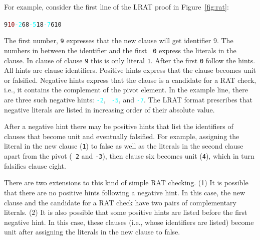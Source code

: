 \documentclass{article}
\begin{document}
For example, consider the first line of the LRAT proof in Figure~\ref{fig:rat}:
\begin{alltt}
\begin{center}
9 \textcolor{darkred}{1 0} \textcolor{cyan}{-2} \textcolor{darkyellow}{6 8} \textcolor{cyan}{-5} \textcolor{darkyellow}{1 8} \textcolor{cyan}{-7} \textcolor{darkyellow}{6 1} 0
\end{center}
\end{alltt}
The first number, {\tt 9} expresses that the new clause will get
identifier 9. The numbers in between the identifier and the first {\tt
  0} express the literals in the clause. In clause of clause {\tt 9}
this is only literal {\tt 1}. After the first {\tt 0} follow the
hints. All hints are clause identifiers. Positive hints express that
the clause becomes unit or falsified.  Negative hints express that the
clause is a candidate for a RAT check, i.e., it contains
the complement of the pivot element. In the example line, there are
three such negative hints: {\tt \textcolor{cyan}{-2}}, {\tt
  \textcolor{cyan}{-5}}, and {\tt \textcolor{cyan}{-7}}. The LRAT
format prescribes that negative literals are listed in increasing
order of their absolute value.

After a negative hint there may be positive hints that list the
identifiers of clauses that become unit and eventually falsified. For
example, assigning the literal in the new clause ({\tt 1}) to false as
well as the literals in the second clause apart from the pivot ({\tt
  2} and {\tt -3}), then clause six becomes unit ({\tt 4}), which in
turn falsifies clause eight.

There are two extensions to this kind of simple RAT checking.
(1) It is possible that there are no positive hints following a negative
hint. In this case, the new clause and the candidate for a RAT check have
two pairs of complementary literals. (2) It is also possible that some
positive hints are listed before the first negative hint. In this
case, these clauses (i.e., whose identifiers are listed) become
unit after assigning the literals in the new clause to false.

%
%
%
%
%
%

%
%
%
%
%
%
%
%
%
%
%
%
%
%
%
%
%
%
%
%
%
%
%
%
%
%
%
\end{document}
